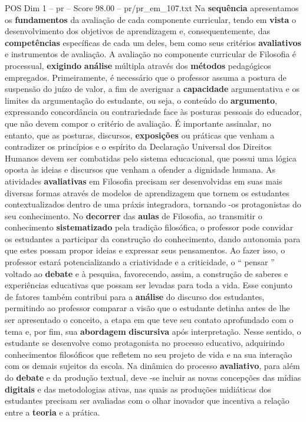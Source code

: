 \begin{textsample}{POS Dim 1 – pr – Score 98.00 – pr/pr\_em\_107.txt}
Na \textbf{sequência} apresentamos os \textbf{fundamentos} da avaliação de cada componente curricular, tendo em \textbf{vista} o desenvolvimento dos objetivos de aprendizagem e, consequentemente, das \textbf{competências} específicas de cada um deles, bem como seus critérios \textbf{avaliativos} e instrumentos de avaliação.
A avaliação no componente curricular de Filosofia é processual, \textbf{exigindo} \textbf{análise} múltipla através dos \textbf{métodos} pedagógicos empregados.
Primeiramente, é necessário que o professor assuma a postura de suspensão do juízo de valor, a fim de averiguar a \textbf{capacidade} argumentativa e os limites da argumentação do estudante, ou seja, o conteúdo do \textbf{argumento}, expressando concordância ou contrariedade face às posturas pessoais do educador, que não devem compor o critério de avaliação.
É importante assinalar, no entanto, que as posturas, discursos, \textbf{exposições} ou práticas que venham a contradizer os princípios e o espírito da Declaração Universal dos Direitos Humanos devem ser combatidas pelo sistema educacional, que possui uma lógica oposta às ideias e discursos que venham a ofender a dignidade humana.
As atividades \textbf{avaliativas} em Filosofia precisam ser desenvolvidas em suas mais diversas formas através de modelos de aprendizagem que tornem os estudantes contextualizados dentro de uma práxis integradora, tornando -os protagonistas do seu conhecimento.
No \textbf{decorrer} das \textbf{aulas} de Filosofia, ao transmitir o conhecimento \textbf{sistematizado} pela tradição filosófica, o professor pode convidar os estudantes a participar da construção do conhecimento, dando autonomia para que estes possam propor ideias e expressar seus pensamentos.
Ao fazer isso, o professor estará potencializando a criatividade e a criticidade, o “ pensar ” voltado ao \textbf{debate} e à pesquisa, favorecendo, assim, a construção de saberes e experiências educativas que possam ser levadas para toda a vida.
Esse conjunto de fatores também contribui para a \textbf{análise} do discurso dos estudantes, permitindo ao professor comparar a visão que o estudante detinha antes de lhe ser apresentado o conceito, a etapa em que teve seu contato aprofundado com o tema e, por fim, sua \textbf{abordagem} \textbf{discursiva} após interpretação.
Nesse sentido, o estudante se desenvolve como protagonista no processo educativo, adquirindo conhecimentos filosóficos que refletem no seu projeto de vida e na sua interação com os demais sujeitos da escola.
Na dinâmica do processo \textbf{avaliativo}, para além do \textbf{debate} e da produção textual, deve -se incluir as novas concepções das mídias \textbf{digitais} e das metodologias ativas, nas quais as produções midiáticas dos estudantes precisam ser avaliadas com o olhar inovador que incentiva a relação entre a \textbf{teoria} e a prática.

\end{textsample}

